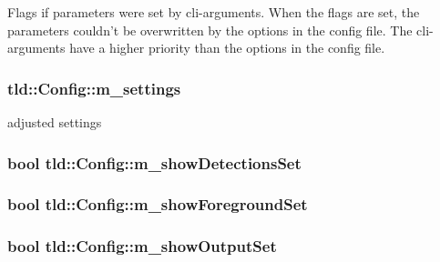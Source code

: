 Flags if parameters were set by cli-\/arguments. When the flags are set, the parameters couldn't be overwritten by the options in the config file. The cli-\/arguments have a higher priority than the options in the config file. \hypertarget{classtld_1_1Config_a0b6892d71d871a35dec2c718696d47bc}{
\subsubsection[{m\-\_\-settings}]{ tld\-::\-Config\-::m\-\_\-settings\hspace{0.3cm}{\ttfamily [private]}}}\label{classtld_1_1Config_a0b6892d71d871a35dec2c718696d47bc}
adjusted settings \hypertarget{classtld_1_1Config_aad85246fc8376bc6e3e6b7e21a24a6a0}{
\subsubsection[{m\-\_\-show\-Detections\-Set}]{\setlength{\rightskip}{0pt plus 5cm}bool tld\-::\-Config\-::m\-\_\-show\-Detections\-Set\hspace{0.3cm}{\ttfamily [private]}}}\label{classtld_1_1Config_aad85246fc8376bc6e3e6b7e21a24a6a0}
\hypertarget{classtld_1_1Config_a120216f53831c7066c0e54c9c1b2bdaf}{
\subsubsection[{m\-\_\-show\-Foreground\-Set}]{\setlength{\rightskip}{0pt plus 5cm}bool tld\-::\-Config\-::m\-\_\-show\-Foreground\-Set\hspace{0.3cm}{\ttfamily [private]}}}\label{classtld_1_1Config_a120216f53831c7066c0e54c9c1b2bdaf}
\hypertarget{classtld_1_1Config_a73f08ef2700b5109fadc8370d81083e0}{
\subsubsection[{m\-\_\-show\-Output\-Set}]{\setlength{\rightskip}{0pt plus 5cm}bool tld\-::\-Config\-::m\-\_\-show\-Output\-Set\hspace{0.3cm}{\ttfamily [private]}}}\label{classtld_1_1Config_a73f08ef2700b5109fadc8370d81083e0}
